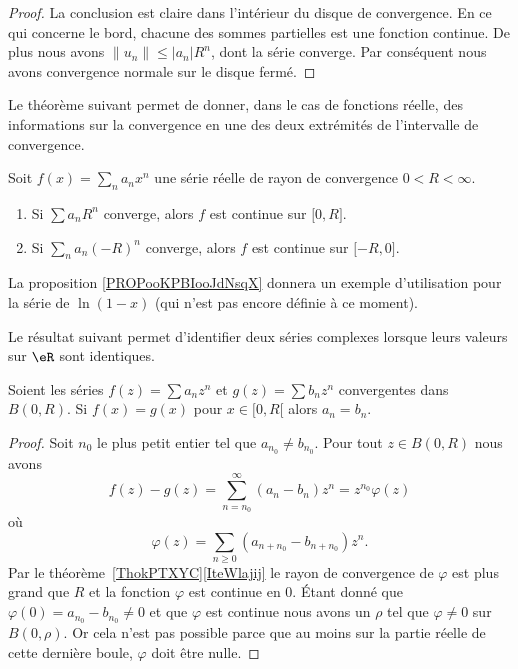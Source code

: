 \begin{proof}
    La conclusion est claire dans l'intérieur du disque de convergence. En ce qui concerne le bord, chacune des sommes partielles est une fonction continue. De plus nous avons \( \| u_n \|\leq | a_n |R^n\), dont la série converge. Par conséquent nous avons convergence normale sur le disque fermé.
\end{proof}

Le théorème suivant permet de donner, dans le cas de fonctions réelle, des informations sur la convergence en une des deux extrémités de l'intervalle de convergence.
\begin{theorem} \label{ThoLUXVjs}
    Soit \( f(x)=\sum_na_nx^n\) une série réelle de rayon de convergence \( 0<R<\infty\).
    \begin{enumerate}
        \item
            Si \( \sum a_nR^n\) converge, alors \( f\) est continue sur \( \mathopen[ 0 , R \mathclose]\).
        \item
            Si \( \sum_na_n(-R)^n\) converge, alors \( f\) est continue sur \( \mathopen[ -R , 0 \mathclose]\).
    \end{enumerate}
\end{theorem}

La proposition \ref{PROPooKPBIooJdNsqX} donnera un exemple d'utilisation pour la série de \( \ln(1-x)\) (qui n'est pas encore définie à ce moment).


Le résultat suivant permet d'identifier deux séries complexes lorsque leurs valeurs sur \( \eR\) sont identiques.
\begin{proposition}
    Soient les séries \( f(z)=\sum a_nz^n\) et \( g(z)=\sum b_n z^n\) convergentes dans \( B(0,R)\). Si \( f(x)=g(x)\) pour \( x\in \mathopen[ 0 , R [\) alors \( a_n=b_n\).
\end{proposition}

\begin{proof}
    Soit \( n_0\) le plus petit entier tel que \( a_{n_0}\neq b_{n_0}\). Pour tout \( z\in B(0,R)\) nous avons
    \begin{equation}
        f(z)-g(z)=\sum_{n=n_0}^{\infty}(a_n-b_n)z^n=z^{n_0}\varphi(z)
    \end{equation}
    où
    \begin{equation}
        \varphi(z)=\sum_{n\geq 0}(a_{n+n_0}-b_{n+n_0})z^n.
    \end{equation}
    Par le théorème~\ref{ThokPTXYC}\ref{IteWlajij} le rayon de convergence de \( \varphi\) est plus grand que \( R\) et la fonction \( \varphi\) est continue en \( 0\). Étant donné que \( \varphi(0)=a_{n_0}-b_{n_0}\neq 0\) et que \( \varphi\) est continue nous avons un \( \rho\) tel que \( \varphi\neq 0\) sur \( B(0,\rho)\). Or cela n'est pas possible parce que au moins sur la partie réelle de cette dernière boule, \( \varphi\) doit être nulle.
\end{proof}

